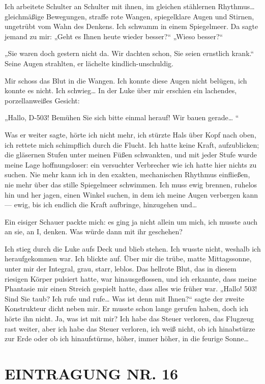 Ich arbeitete Schulter an Schulter mit ihnen, im gleichen
stählernen Rhythmus\ldots{} gleichmäßige Bewegungen, straffe rote
Wangen, spiegelklare Augen und Stirnen, ungetrübt vom Wahn des
Denkens. Ich schwamm in einem Spiegelmeer. Da sagte jemand zu mir:
„Geht es Ihnen heute wieder besser?“ „Wieso besser?“

„Sie waren doch gestern nicht da. Wir dachten schon, Sie seien
ernstlich krank.“ Seine Augen strahlten, er lächelte
kindlich-unschuldig.

Mir schoss das Blut in die Wangen. Ich konnte diese Augen nicht
belügen, ich konnte es nicht. Ich schwieg\ldots{} In der Luke über mir
erschien ein lachendes, porzellanweißes Gesicht:

„Hallo, D-503! Bemühen Sie sich bitte einmal herauf! Wir bauen
gerade\ldots{} “

Was er weiter sagte, hörte ich nicht mehr, ich stürzte Hals über
Kopf nach oben, ich rettete mich schimpflich durch die Flucht. Ich
hatte keine Kraft, aufzublicken; die gläsernen Stufen unter meinen
Füßen schwankten, und mit jeder Stufe wurde meine Lage
hoffnungsloser: ein versuchter Verbrecher wie ich hatte hier nichts
zu suchen. Nie mehr kann ich in den exakten, mechanischen Rhythmus
einfließen, nie mehr über das stille Spiegelmeer schwimmen. Ich
muss ewig brennen, ruhelos hin und her jagen, einen Winkel suchen,
in dem ich meine Augen verbergen kann — ewig, bis ich endlich die
Kraft aufbringe, hinzugehen und\ldots{}

Ein eisiger Schauer packte mich: es ging ja nicht allein um mich,
ich musste auch an sie, an I, denken. Was würde dann mit ihr
geschehen?

Ich stieg durch die Luke aufs Deck und blieb stehen. Ich wusste
nicht, weshalb ich heraufgekommen war. Ich blickte auf. Über mir
die trübe, matte Mittagssonne, unter mir der Integral, grau, starr,
leblos. Das hellrote Blut, das in diesem riesigen Körper pulsiert
hatte, war hinausgeflossen, und ich erkannte, dass meine Phantasie
mir einen Streich gespielt hatte, dass alles wie früher war.
„Hallo! 503! Sind Sie taub? Ich rufe und rufe\ldots{} Was ist denn mit
Ihnen?“ sagte der zweite Konstrukteur dicht neben mir. Er musste
schon lange gerufen haben, doch ich hörte ihn nicht. Ja, was ist
mit mir? Ich habe das Steuer verloren, das Flugzeug rast weiter,
aber ich habe das Steuer verloren, ich weiß nicht, ob ich
hinabstürze zur Erde oder ob ich hinaufstürme, höher, immer höher,
in die feurige Sonne\ldots{}

\section{EINTRAGUNG NR. 16}

